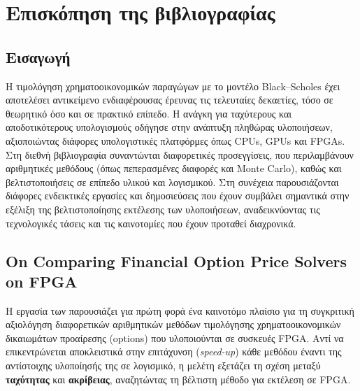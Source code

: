 \chapter{Επισκόπηση της βιβλιογραφίας}
\label{ch:lit_rev}


\section{Εισαγωγή}

Η τιμολόγηση χρηματοοικονομικών παραγώγων με το μοντέλο Black–Scholes έχει αποτελέσει αντικείμενο ενδιαφέρουσας έρευνας τις τελευταίες δεκαετίες,
τόσο σε θεωρητικό όσο και σε πρακτικό επίπεδο.
Η ανάγκη για ταχύτερους και αποδοτικότερους υπολογισμούς οδήγησε στην ανάπτυξη πληθώρας υλοποιήσεων, αξιοποιώντας διάφορες υπολογιστικές πλατφόρμες
όπως CPUs, GPUs και FPGAs. Στη διεθνή βιβλιογραφία συναντώνται διαφορετικές προσεγγίσεις, που περιλαμβάνουν αριθμητικές μεθόδους (όπως πεπερασμένες διαφορές και Monte Carlo),
καθώς και βελτιστοποιήσεις σε επίπεδο υλικού και λογισμικού.
Στη συνέχεια παρουσιάζονται διάφορες ενδεικτικές εργασίες και δημοσιεύσεις που έχουν συμβάλει σημαντικά στην εξέλιξη της βελτιστοποίησης εκτέλεσης των υλοποιήσεων,
αναδεικνύοντας τις τεχνολογικές τάσεις και τις καινοτομίες που έχουν προταθεί διαχρονικά.

\section{On Comparing Financial Option Price Solvers on FPGA}

Η εργασία των \cite{comparing_option_price_solvers_fpga} παρουσιάζει για πρώτη φορά ένα καινοτόμο πλαίσιο για τη συγκριτική αξιολόγηση διαφορετικών αριθμητικών
μεθόδων τιμολόγησης χρηματοοικονομικών δικαιωμάτων προαίρεσης (options) που υλοποιούνται σε συσκευές FPGA.
Αντί να επικεντρώνεται αποκλειστικά στην επιτάχυνση (\textit{speed-up}) κάθε μεθόδου έναντι της αντίστοιχης υλοποίησής της σε λογισμικό, η μελέτη εξετάζει
τη σχέση μεταξύ \textbf{ταχύτητας} και \textbf{ακρίβειας}, αναζητώντας τη βέλτιστη μέθοδο για εκτέλεση σε FPGA.

